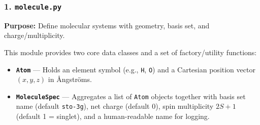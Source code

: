 \documentclass[
  11pt,
]{report}
\providecommand{\tightlist}{%
  \setlength{\itemsep}{0pt}\setlength{\parskip}{0pt}}
\begin{document}
\subsubsection{\texorpdfstring{1.
\texttt{molecule.py}}{1. molecule.py}}\label{molecule.py}

\textbf{Purpose:} Define molecular systems with geometry, basis set, and
charge/multiplicity.

This module provides two core data classes and a set of factory/utility
functions:

\begin{itemize}
\tightlist
\item
  \textbf{\texttt{Atom}} --- Holds an element symbol (e.g.,
  \texttt{\textquotesingle{}H\textquotesingle{}},
  \texttt{\textquotesingle{}O\textquotesingle{}}) and a Cartesian
  position vector \((x, y, z)\) in Ångströms.
\item
  \textbf{\texttt{MoleculeSpec}} --- Aggregates a list of \texttt{Atom}
  objects together with basis set name (default \texttt{sto-3g}), net
  charge (default 0), spin multiplicity \(2S+1\) (default 1 = singlet),
  and a human-readable name for logging.
\end{itemize}
\end{document}
